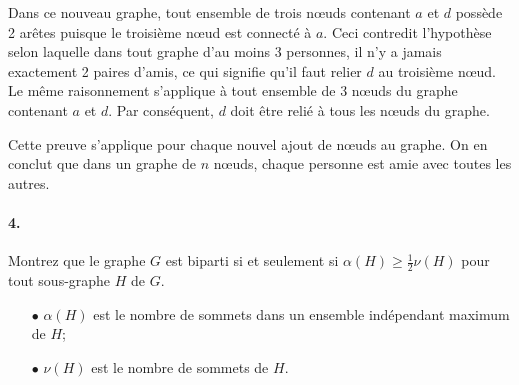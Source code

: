 \begin{solution}
Dans ce nouveau graphe, tout ensemble de trois nœuds contenant $a$ et $d$ possède 2 arêtes puisque le troisième nœud est connecté à $a$. Ceci contredit l'hypothèse selon laquelle dans tout graphe d'au moins 3 personnes, il n'y a jamais exactement 2 paires d'amis, ce qui signifie qu'il faut relier $d$ au troisième nœud. Le même raisonnement s'applique à tout ensemble de 3 nœuds du graphe contenant $a$ et $d$. Par conséquent, $d$ doit être relié à tous les nœuds du graphe.

\begin{center}
\end{center}

Cette preuve s'applique pour chaque nouvel ajout de nœuds au graphe. On en conclut que dans un graphe de $n$ nœuds, chaque personne est amie avec toutes les autres.
\end{solution}

\paragraph{4. } Montrez que le graphe $G$ est biparti si et seulement si $\alpha(H) \geq \frac{1}{2} \nu(H)$ pour tout sous-graphe $H$ de $G$.
\begin{enumerate}
  \item[$\bullet$] $\alpha(H)$ est le nombre de sommets dans un ensemble indépendant maximum de $H$;
  \item[$\bullet$] $\nu(H)$ est le nombre de sommets de $H$.
\end{enumerate}

